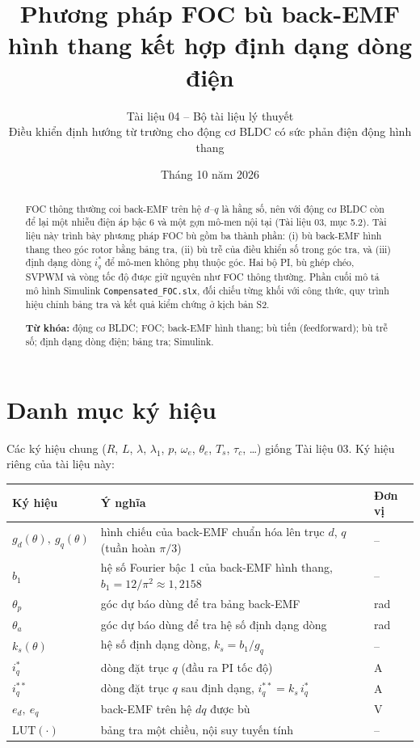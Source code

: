 \documentclass[11pt,a4paper]{article}
\title{\vspace{-1.2cm}\textbf{Phương pháp FOC bù back-EMF hình thang kết hợp định dạng dòng điện}}
\author{\normalsize Tài liệu 04 -- Bộ tài liệu lý thuyết\\[2pt]
\small Điều khiển định hướng từ trường cho động cơ BLDC có sức phản điện động hình thang}
\date{\small Tháng 10 năm 2026}
\begin{document}
\maketitle

\begin{abstract}
\noindent FOC thông thường coi back-EMF trên hệ $d$–$q$ là hằng số, nên với động cơ BLDC còn để lại một nhiễu điện áp bậc 6 và một gợn mô-men nội tại (Tài liệu 03, mục 5.2). Tài liệu này trình bày phương pháp FOC bù gồm ba thành phần: (i) bù back-EMF hình thang theo góc rotor bằng bảng tra, (ii) bù trễ của điều khiển số trong góc tra, và (iii) định dạng dòng $i_q^*$ để mô-men không phụ thuộc góc. Hai bộ PI, bù ghép chéo, SVPWM và vòng tốc độ được giữ nguyên như FOC thông thường. Phần cuối mô tả mô hình Simulink \texttt{Compensated\_FOC.slx}, đối chiếu từng khối với công thức, quy trình hiệu chỉnh bảng tra và kết quả kiểm chứng ở kịch bản S2.

\vspace{0.5em}
\noindent\textbf{Từ khóa:} động cơ BLDC; FOC; back-EMF hình thang; bù tiến (feedforward); bù trễ số; định dạng dòng điện; bảng tra; Simulink.
\end{abstract}


\tableofcontents
\newpage

\section*{Danh mục ký hiệu}

Các ký hiệu chung ($R$, $L$, $\lambda$, $\lambda_1$, $p$, $\omega_e$, $\theta_e$, $T_s$, $\tau_c$, \ldots{}) giống Tài liệu 03. Ký hiệu riêng của tài liệu này:

\begin{center}\small
\begin{tabularx}{\linewidth}{@{}l>{\raggedright\arraybackslash}Xl@{}}
\toprule
Ký hiệu & Ý nghĩa & Đơn vị \\ \midrule
$g_d(\theta),\ g_q(\theta)$ & hình chiếu của back-EMF chuẩn hóa lên trục $d$, $q$ (tuần hoàn $\pi/3$) & – \\
$b_1$ & hệ số Fourier bậc 1 của back-EMF hình thang, $b_1 = 12/\pi^2 \approx 1{,}2158$ & – \\
$\theta_p$ & góc dự báo dùng để tra bảng back-EMF & rad \\
$\theta_a$ & góc dự báo dùng để tra hệ số định dạng dòng & rad \\
$k_s(\theta)$ & hệ số định dạng dòng, $k_s = b_1/g_q$ & – \\
$i_q^*$ & dòng đặt trục $q$ (đầu ra PI tốc độ) & A \\
$i_q^{**}$ & dòng đặt trục $q$ sau định dạng, $i_q^{**} = k_s\, i_q^*$ & A \\
$e_d,\ e_q$ & back-EMF trên hệ $dq$ được bù & V \\
$\mathrm{LUT}(\cdot)$ & bảng tra một chiều, nội suy tuyến tính & – \\
\bottomrule
\end{tabularx}
\end{center}
\end{document}
